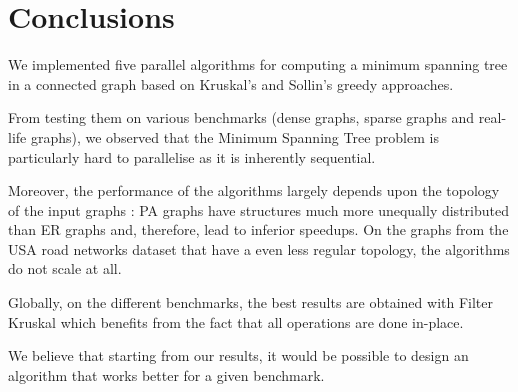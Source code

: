 \documentclass[letterpaper]{article}
\begin{document}
\section{Conclusions}

We implemented five parallel algorithms for computing a minimum spanning tree in a connected graph based on Kruskal's and Sollin's greedy approaches.

From testing them on various benchmarks (dense graphs, sparse graphs and real-life graphs), we observed that the Minimum Spanning Tree problem is particularly hard to parallelise as it is inherently sequential. 

Moreover, the performance of the algorithms largely depends upon the topology of the input graphs : PA graphs have structures much more unequally distributed than ER graphs and, therefore, lead to inferior speedups. On the graphs from the USA road networks dataset that have a even less regular topology, the algorithms do not scale at all.

Globally, on the different benchmarks, the best results are obtained with Filter Kruskal which benefits from the fact that all operations are done in-place.

We believe that starting from our results, it would be possible to design an algorithm that works better for a given benchmark.


\clearpage



\end{document}
